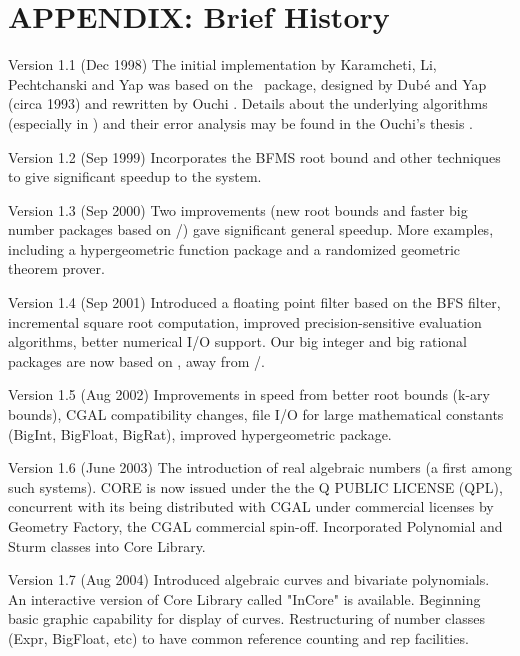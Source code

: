 
\newpage
\section{APPENDIX: Brief History}

\begin{description}
\item{Version 1.1}
(Dec 1998) The initial implementation
by Karamcheti, Li, Pechtchanski and Yap \cite{klpy:core:98}
was based on the \rexpr\ package,
designed by Dub\'e and Yap (circa 1993)
and rewritten by Ouchi \cite{ouchi:thesis}.  
Details about the underlying 
algorithms (especially in \BF) and their error analysis
may be found in the Ouchi's thesis \cite{ouchi:thesis}.

\item{Version 1.2}
(Sep 1999) Incorporates the BFMS root bound and other 
techniques to give significant speedup to the system. 

\item{Version 1.3}
(Sep 2000) Two improvements (new root bounds
and faster big number packages based on \lidia/\cln)
gave significant general speedup.  
More examples, including a hypergeometric function package
and a randomized geometric theorem prover.

\item{Version 1.4}
(Sep 2001) 
Introduced a floating point filter based on the BFS filter,
incremental square root computation,
improved precision-sensitive evaluation algorithms,
better numerical I/O support.
Our big integer and big rational packages
are now based on \gmp, away from \lidia/\cln.

\item{Version 1.5}
(Aug 2002) Improvements in speed from better root bounds (k-ary bounds),
CGAL compatibility changes, file I/O for large mathematical constants
(BigInt, BigFloat, BigRat), improved hypergeometric package.

\item{Version 1.6}
(June 2003)  The introduction of real algebraic numbers (a first
among such systems).
CORE is now issued under the the Q PUBLIC LICENSE (QPL),
concurrent with its being distributed with CGAL under commercial
licenses by Geometry Factory, the CGAL commercial spin-off.
Incorporated Polynomial and Sturm classes into Core Library.

\item{Version 1.7}
(Aug 2004) Introduced algebraic curves and bivariate polynomials.
An interactive version of Core Library called "InCore" is available.
Beginning basic graphic capability for display of curves.  
Restructuring of number classes (Expr, BigFloat, etc)
to have common reference counting and rep facilities.

\end{description}


